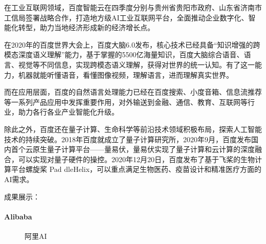 \documentclass[letterpaper,11pt,english]{sphinxmanual}
\begin{document}
在工业互联网领域，百度智能云在四季度分别与贵州省贵阳市政府、山东省济南市工信局签署战略合作，打造地方级AI工业互联网平台，全面推动企业数字化、智能化转型，助力当地经济形成新的经济增长点。
%
\begin{footnote}[660]\sphinxAtStartFootnote
{}
%
\end{footnote}

在2020年的百度世界大会上，百度大脑6.0发布，核心技术已经具备“知识增强的跨模态深度语义理解”能力，基于掌握的5500亿海量知识，百度大脑综合语音、语言、视觉等不同信息，实现跨模态语义理解，获得对世界的统一认知。有了这一能力，机器就能听懂语音，看懂图像视频，理解语言，进而理解真实世界。

而在应用层面，百度的自然语言处理能力已经在百度搜索、小度音箱、信息流推荐等一系列产品应用中发挥重要作用，对外输送到金融、通信、教育、互联网等行业，助力各行各业产业智能化升级。

除此之外，百度还在量子计算、生命科学等前沿技术领域积极布局，探索人工智能技术的持续突破。2018年百度就成立了量子计算研究所，2020年9月，百度发布国内首个云原生量子计算平台——量易伏，量易伏实现了量子计算和云计算的深度融合，可以实现对量子硬件的操控。2020年12月20日，百度发布了基于飞桨的生物计算平台\sphinxhyphen{}螺旋桨
Pad
dleHelix，可以重点满足生物医药、疫苗设计和精准医疗方面的AI需求。%
\begin{footnote}[661]\sphinxAtStartFootnote
{}
%
\end{footnote}

\begin{center}\end{center} 

成果展示：


\paragraph{Alibaba}
\label{\detokenize{chapter_project/AI_company:alibaba}}
\begin{figure}[H]
\centering
\capstart

\noindent{}
\caption{阿里AI\sphinxfootnotemark[662]}\label{\detokenize{chapter_project/AI_company:id22}}\end{figure}
%
\begin{footnotetext}[662]\sphinxAtStartFootnote
{}
%
\end{footnotetext}\ignorespaces 
\end{document}
